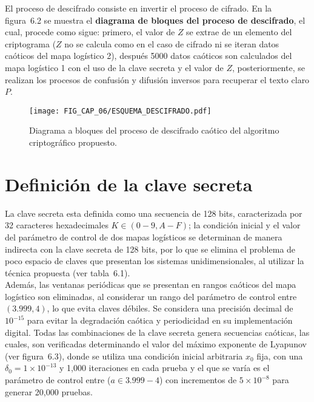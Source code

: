 El proceso de descifrado consiste en invertir el proceso de cifrado. En la figura~6.2 se muestra el \textbf{diagrama de bloques del proceso de descifrado}, el cual, procede como sigue: primero, el valor de $Z$ se extrae de un elemento del criptograma ($Z$ no se calcula como en el caso de cifrado ni se iteran datos caóticos del mapa logístico 2), después 5000 datos caóticos son calculados del mapa logístico 1 con el uso de la clave secreta y el valor de $Z$, posteriormente, se realizan los procesos de confusión y difusión inversos para recuperar el texto claro $P$.  \\  

\begin{figure}[!htbp] %
	\center
	\texttt{[image: FIG\_CAP\_06/ESQUEMA\_DESCIFRADO.pdf]}   
	\caption{Diagrama a bloques del proceso de descifrado caótico del algoritmo criptográfico propuesto.}
\end{figure}

\section{Definición de la clave secreta}
La clave secreta esta definida como una secuencia de 128 bits, caracterizada por 32 caracteres hexadecimales $K\in (0-9,A-F)$; la condición inicial y el valor del parámetro de control de dos mapas logísticos se determinan de manera indirecta con la clave secreta de 128 bits, por lo que se elimina el problema de poco espacio de claves que presentan los sistemas unidimensionales, al utilizar la técnica propuesta (ver tabla~6.1). \\

Además, las ventanas periódicas que se presentan en rangos caóticos del mapa logístico son eliminadas, al considerar un rango del parámetro de control entre $(3.999,4)$, lo que evita claves débiles. Se considera una precisión decimal de $10^{-15}$ para evitar la degradación caótica y periodicidad en su implementación digital. Todas las combinaciones de la clave secreta genera secuencias caóticas, las cuales, son verificadas determinando el valor del máximo exponente de Lyapunov (ver figura~6.3), donde se utiliza una condición inicial arbitraria $x_{0}$ fija, con una $\delta_{0}=1\times 10^{-13}$ y 1,000 iteraciones en cada prueba y el que se varía es el parámetro de control entre ($a\in 3.999-4$) con incrementos de $5\times 10^{-8}$ para generar 20,000 pruebas. \\  

